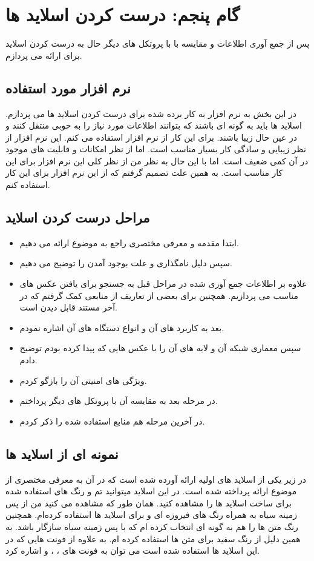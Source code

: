 \def \Subject {گام پنجم: درست کردن اسلاید ها}
\section{\Subject}
پس از جمع آوری اطلاعات و مقایسه با با پروتکل های دیگر حال به درست کردن اسلاید برای ارائه می پردازم.
\subsection{نرم افزار مورد استفاده}
در این بخش به نرم افزار به کار برده شده برای درست کردن اسلاید ها می پردازم. اسلاید ها باید به گونه ای باشند که بتوانند اطلاعات مورد نیاز را به خوبی منتقل کنند و در عین حال زیبا باشند. برای این کار از نرم افزار 
استفاده می کنم. این نرم افزار از نظر زیبایی و سادگی کار بسیار مناسب است. اما از نظر امکانات و قابلیت های موجود در آن کمی ضعیف است. اما با این حال به نظر من از نظر کلی این نرم افزار برای این کار مناسب است. 
به همین علت تصمیم گرفتم که از این نرم افزار برای این کار استفاده کنم.
\subsection{مراحل درست کردن اسلاید}
\begin{itemize}
    \item {
        ابتدا مقدمه و معرفی مختصری راجع به موضوع ارائه می دهیم.
    }
    \item {
        سپس دلیل نامگذاری و علت بوجود آمدن را توضیح می دهیم.
    }
    \item {
        علاوه بر اطلاعات جمع آوری شده در مراحل قبل به جستجو برای یافتن عکس های مناسب می پردازیم.
        همچنین برای بعضی از تعاریف از منابعی کمک گرفتم که در آخر مستند قابل دیدن است.
    }
    \item {
        بعد به کاربرد های آن و انواع دستگاه های آن اشاره نمودم.
    }
    \item {
        سپس معماری شبکه آن و لایه های آن را با عکس هایی که پیدا کرده بودم توضیح دادم.
    }
    \item {
        ویژگی های امنیتی آن را بازگو کردم.
    }
    \item {
        در مرحله بعد به مقایسه آن با پروتکل های دیگر پرداختم.
    }
    \item {
        در آخرین مرحله هم منابع استفاده شده را ذکر کردم.
    }
\end{itemize}

\subsection{نمونه ای از اسلاید ها}
در زیر یکی از اسلاید های اولیه ارائه آورده شده است که در آن به معرفی مختصری از موضوع ارائه پرداخته شده است.
در این اسلاید میتوانید تم و رنگ های استفاده شده برای ساخت اسلاید ها را مشاهده کنید.
همان طور که مشاهده می کنید من از پس زمینه  سیاه به همراه رنگ های فیروزه ای و برای اسلاید ها استفاده کرده‌ام.
همچنین رنگ متن ها را هم به گونه ای انتخاب کرده ام که با پس زمینه سیاه سازگار باشد.
به همین دلیل از رنگ سفید برای متن ها استفاده کرده ام.
به علاوه از فونت هایی که در این اسلاید ها استفاده شده است می توان به فونت های
،
،
و
اشاره کرد.


